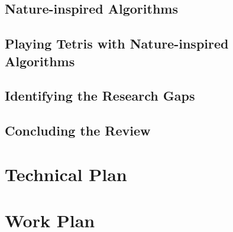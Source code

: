 \documentclass[a4paper, 12pt]{extreport}
\begin{document}
		\section{Nature-inspired Algorithms}
		
		
		\section{Playing Tetris with Nature-inspired Algorithms}
		
		
		\section{Identifying the Research Gaps}
		
		
		\section{Concluding the Review}
	
	\chapter{Technical Plan}
	
		
	
	\chapter{Work Plan}
		
	
	\printbibliography[heading={bibnumbered}, title={References}]
		
\end{document}
